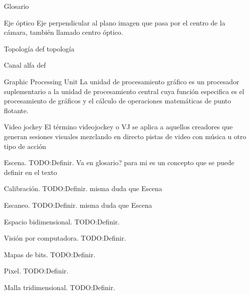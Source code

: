 ﻿
Glosario

Eje óptico 
 Eje perpendicular al plano imagen que pasa por el centro de la cámara, también llamado centro óptico.

Topología
 def topología

Canal alfa
 def 

Graphic Processing Unit
 La unidad de procesamiento gráfico es un procesador suplementario a la unidad de procesamiento central cuya función especifica es el procesamiento de gráficos y el cálculo de operaciones matemáticas de punto flotante.

Video jockey
 El término videojockey o VJ se aplica a aquellos creadores que generan sesiones visuales mezclando en directo pistas de video con música u otro tipo de acción

Escena.
 TODO:Definir. Va en glosario? para mi es un concepto que se puede definir en el texto

Calibración.
 TODO:Definir. misma duda que Escena

Escaneo.
 TODO:Definir. misma duda que Escena

Espacio bidimensional.
 TODO:Definir.

Visión por computadora.
 TODO:Definir.

Mapas de bits.
 TODO:Definir.

Pixel.
 TODO:Definir.

Malla tridimensional.
 TODO:Definir.

